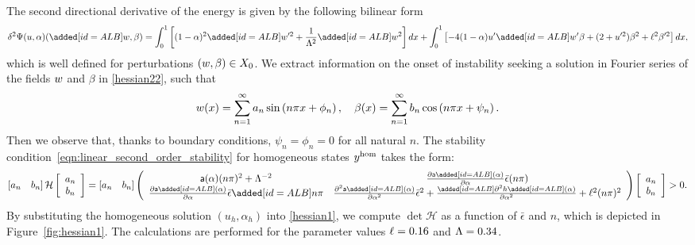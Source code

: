 {The second directional derivative of the energy is given by the following bilinear form}
\begin{equation}
    \delta^2 \Estiff(u,\alpha)(\albadd{\utest},\beta)=\int_0^1 \left[(1-\alpha)^2\albadd{\utest}'^2
        +\frac{1}{\elastell^2} \albadd{\utest}^2 \right]dx
    +\int_0^1
    \left[ - 4(1-\alpha)u' \albadd{\utest}'\beta+(2+ u'^2)\beta^2+\damagell^2\beta'^2 \right] dx,
    \label{hessian22}
\end{equation}
which is well defined for perturbations $(w, \beta)\in X_0$.
    {We} extract information on the onset of instability  seeking a solution in Fourier series of the fields $w$ and $\beta$ in \eqref{hessian22}, such that $$w(x)=\sum_{n=1}^{\infty} a_{n} \sin \left(n \pi x+\phi_{n}\right), \quad \beta(x)=\sum_{n=1}^{\infty} b_{n} \cos \left(n \pi x+\psi_{n}\right).$$
Then we observe that, thanks to boundary conditions, $\psi_{n}=\phi_{n}=0$ for all natural $n$. The stability condition~\eqref{eqn:linear_second_order_stability} {for homogeneous states $y^{\text{hom}}$} takes the form:
\begin{align}\left[ a_n \quad b_n \right] \mathcal{H} \left[ \begin{array}{c} a_n \\ b_n \end{array} \right]=\left[ a_n \quad b_n \right]\left(
    \begin{array}{cc}
            \soften(\alpha)(n\pi)^2+\elastell^{-2}                                              & \frac{\partial \soften\albadd{(\alpha)}}{\partial \alpha}\bar\epsilon(n\pi)                                                                                       \\
            \frac{\partial \soften\albadd{(\alpha)}}{\partial \alpha}\bar\epsilon \albadd{n\pi} & \frac{\partial^2 \soften\albadd{(\alpha)}}{\partial \alpha^2}\bar\epsilon^2+ \frac{\albadd{\partial^2} h\albadd{(\alpha)}}{\partial \alpha^2}+\damagell^2(n\pi)^2 \\
        \end{array}
    \right)\left[ \begin{array}{c} a_n \\ b_n \end{array} \right]>0.\label{hessian1}\end{align}
% 
By substituting the homogeneous solution $(u_h, \alpha_h)$ into \eqref{hessian1}, we compute $\det \mathcal{H}$ as a function of $\bar \epsilon$ and $n$, which is depicted in Figure~\ref{fig:hessian1}. The calculations are performed for the parameter values $\ell=0.16$ and $\Lambda=0.34$.
